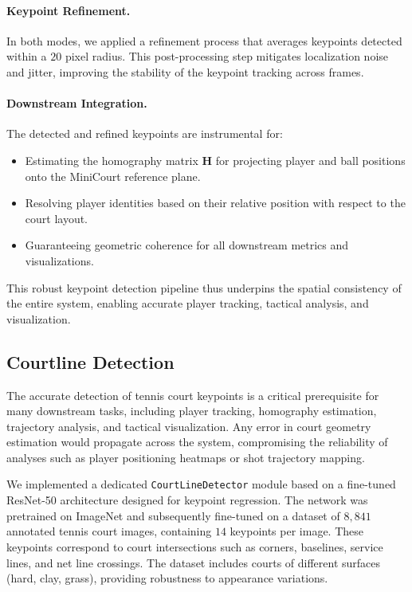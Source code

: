 \paragraph{Keypoint Refinement.}  
In both modes, we applied a refinement process that averages keypoints detected within a $20$ pixel radius.  
This post-processing step mitigates localization noise and jitter, improving the stability of the keypoint tracking across frames.

\paragraph{Downstream Integration.}  
The detected and refined keypoints are instrumental for:
\begin{itemize}
    \item Estimating the homography matrix $\mathbf{H}$ for projecting player and ball positions onto the MiniCourt reference plane.
    \item Resolving player identities based on their relative position with respect to the court layout.
    \item Guaranteeing geometric coherence for all downstream metrics and visualizations.
\end{itemize}

This robust keypoint detection pipeline thus underpins the spatial consistency of the entire system, enabling accurate player tracking, tactical analysis, and visualization.

\subsection{Courtline Detection}

The accurate detection of tennis court keypoints is a critical prerequisite for many downstream tasks, including player tracking, homography estimation, trajectory analysis, and tactical visualization. 
Any error in court geometry estimation would propagate across the system, compromising the reliability of analyses such as player positioning heatmaps or shot trajectory mapping.

We implemented a dedicated \texttt{CourtLineDetector} module based on a fine-tuned ResNet-50 architecture designed for keypoint regression.  
The network was pretrained on ImageNet and subsequently fine-tuned on a dataset of $8,841$ annotated tennis court images, containing $14$ keypoints per image. 
These keypoints correspond to court intersections such as corners, baselines, service lines, and net line crossings. 
The dataset includes courts of different surfaces (hard, clay, grass), providing robustness to appearance variations.

